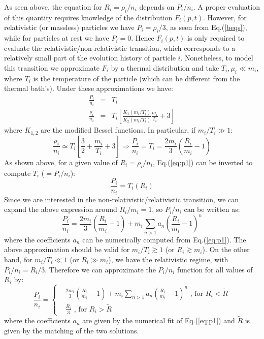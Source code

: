 \documentclass[preprint,notoc]{JHEP3}
\def\To{\Rightarrow}
\begin{document}
As seen above, the equation for $R_i = \rho_i/n_i$ depends on $P_i/n_i$. A proper evaluation of this quantity
requires knowledge of the distribution $F_i(p,t)$. However, for relativistic (or
massless) particles we have $P_i = \rho_i/3$, as seen from Eq.(\ref{beqs}), while for particles at rest we have $P_i = 0$. Hence $F_i(p,t)$ is only 
required to evaluate the relativistic/non-relativistic transition, which corresponds to a relatively small part of the evolution history
of particle $i$. Nonetheless, to model this transition we approximate $F_i$ by a thermal distribution and take $T_i, \mu_i \ll m_i$, where $T_i$ is
the temperature of the particle (which can be different from the thermal bath's). Under these approximations we have:
\begin{eqnarray}
\frac{P_i}{n_i} & = & T_i \nonumber \\
\frac{\rho_i}{n_i} & = & T_i \left[ \frac{K_1(m_i/T_i)}{K_2(m_i/T_i)} \frac{m_i}{T_i} + 3 \right] \label{eq:p1}
\end{eqnarray}
where $K_{1,2}$ are the modified Bessel functions. In particular, if $m_i/T_i \gg 1$:
\begin{equation}
\frac{\rho_i}{n_i} \simeq T_i \left[\frac{3}{2} + \frac{m_i}{T_i}  + 3 \right] \To \frac{P_i}{n_i} = T_i = \frac{2 m_i}{3}\left( \frac{R_i}{m_i} -1 \right)
\end{equation}
As shown above, for a given value of $R_i = \rho_i/n_i$, Eq.(\ref{eq:p1}) can be inverted to compute $T_i$ ($=P_i/n_i$):
\begin{equation}
\frac{P_i}{n_i} = T_i(R_i)
\end{equation}
Since we are interested in the non-relativistic/relativistic transition, we can expand the above expression around $R_i/m_i = 1$,
so $P_i/n_i$ can be written as:
\begin{equation}
\frac{P_i}{n_i} = \frac{2 m_i}{3}\left( \frac{R_i}{m_i} -1 \right) + m_i \sum_{n >1} a_n \left(\frac{R_i}{m_i} -1 \right)^n
\end{equation}
where the coefficients $a_n$ can be numerically computed from Eq.(\ref{eq:p1}). The above approximation should be valid for
$m_i/T_i \gtrsim 1$ (or $R_i \gtrsim m_i$). On the other hand, for $m_i/T_i \ll 1$ (or $R_i \gg m_i$), we have the 
relativistic regime, with $P_i/n_i = R_i/3$.
Therefore we can approximate the $P_i/n_i$ function for all values of $R_i$ by:
\begin{equation}
\frac{P_i}{n_i} = \left\{ \begin{array}{rl}
& \frac{2 m_i}{3}\left( \frac{R_i}{m_i} -1 \right) + m_i \sum_{n >1} a_n \left(\frac{R_i}{m_i} -1 \right)^n  \mbox{ , for $R_i < \tilde{R}$} \\
& \frac{R_i}{3}  \mbox{ , for $R_i > \tilde{R}$} 
\end{array} \right. \label{Pfin}
\end{equation}
where the coefficients $a_n$ are given by the numerical fit of Eq.(\ref{eq:p1}) and $\tilde{R}$ is given by the matching of the two solutions.
\end{document}

